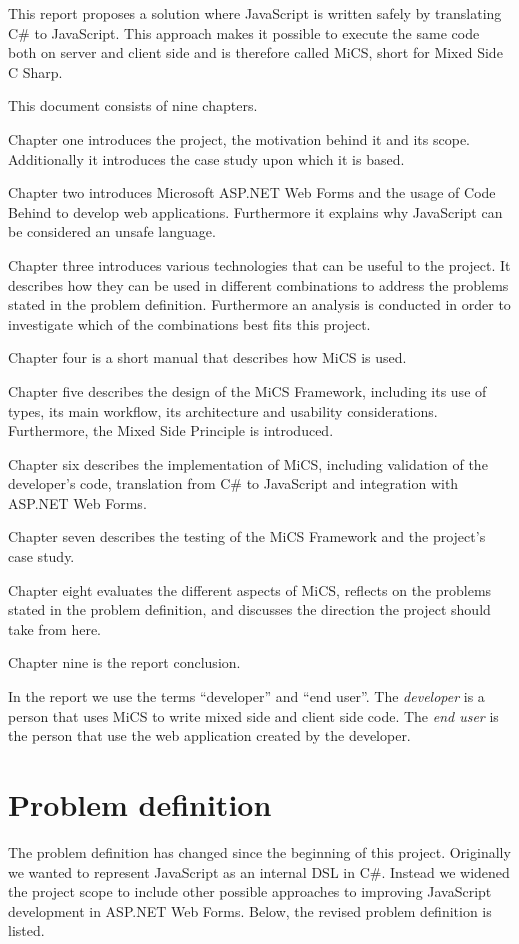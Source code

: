 	This report proposes a solution where JavaScript is written safely by translating C\# to JavaScript. This approach makes it possible to execute the same code both on server and client side and is therefore called MiCS, short for Mixed Side C Sharp.

	This document consists of nine chapters.

	Chapter one introduces the project, the motivation behind it and its scope. Additionally it introduces the case study upon which it is based.

	Chapter two introduces Microsoft ASP.NET Web Forms and the usage of Code Behind to develop web applications. Furthermore it explains why JavaScript can be considered an unsafe language.

	Chapter three introduces various technologies that can be useful to the project. It describes how they can be used in different combinations to address the problems stated in the problem definition. Furthermore an analysis is conducted in order to investigate which of the combinations best fits this project.

	Chapter four is a short manual that describes how MiCS is used.

	Chapter five describes the design of the MiCS Framework, including its use of types, its main workflow, its architecture and usability considerations. Furthermore, the Mixed Side Principle is introduced.

	Chapter six describes the implementation of MiCS, including validation of the developer's code, translation from C\# to JavaScript and integration with ASP.NET Web Forms.

	Chapter seven describes the testing of the MiCS Framework and the project's case study.
	
	Chapter eight evaluates the different aspects of MiCS, reflects on the problems stated in the problem definition, and discusses the direction the project should take from here.

	Chapter nine is the report conclusion.

	In the report we use the terms ``developer'' and ``end user''. The \emph{developer} is a person that uses MiCS to write mixed side and client side code. The \emph{end user} is the person that use the web application created by the developer.


\section{Problem definition}
	The problem definition has changed since the beginning of this project. Originally we wanted to represent JavaScript as an internal DSL in C\#. Instead we widened the project scope to include other possible approaches to improving JavaScript development in ASP.NET Web Forms. Below, the revised problem definition is listed.

